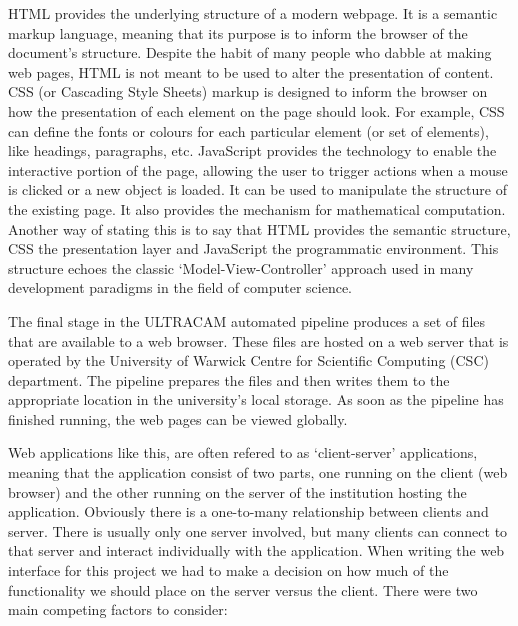 HTML provides the underlying structure of a modern webpage. It is a semantic markup language, meaning that its purpose is to inform the browser of the document's structure. Despite the habit of many people who dabble at making web pages, HTML is not meant to be used to alter the presentation of content. CSS (or Cascading Style Sheets) markup is designed to inform the browser on how the presentation of each element on the page should look. For example, CSS can define the fonts or colours for each particular element (or set of elements), like headings, paragraphs, etc. JavaScript provides the technology to enable the interactive portion of the page, allowing the user to trigger actions when a mouse is clicked or a new object is loaded. It can be used to manipulate the structure of the existing page. It also provides the mechanism for mathematical computation. Another way of stating this is to say that HTML provides the semantic structure, CSS the presentation layer and JavaScript the programmatic environment. This structure echoes the classic `Model-View-Controller' approach used in many development paradigms in the field of computer science.

The final stage in the ULTRACAM automated pipeline produces a set of files that are available to a web browser. These files are hosted on a web server that is operated by the University of Warwick Centre for Scientific Computing (CSC) department. The pipeline prepares the files and then writes them to the appropriate location in the university's local storage. As soon as the pipeline has finished running, the web pages can be viewed globally. 

\label{sect:clientserver}
Web applications like this, are often refered to as `client-server' applications, meaning that the application consist of two parts, one running on the client (web browser) and the other running on the server of the institution hosting the application. Obviously there is a one-to-many relationship between clients and server. There is usually only one server involved, but many clients can connect to that server and interact individually with the application. When writing the web interface for this project we had to make a decision on how much of the functionality we should place on the server versus the client. There were two main competing factors to consider:

